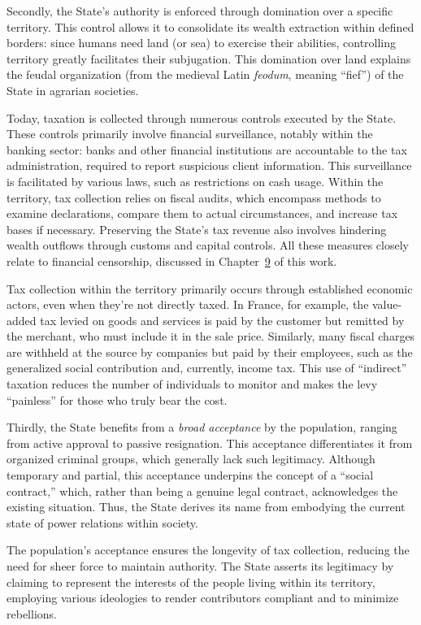 \documentclass[
  a5paper,
  smalldemyvopaper,10pt,twoside,onecolumn,openright,extrafontsizes,hidelinks]{memoir}
\begin{document}
Secondly, the State's authority is enforced through domination over a
specific territory. This control allows it to consolidate its wealth
extraction within defined borders: since humans need land (or sea) to
exercise their abilities, controlling territory greatly facilitates
their subjugation. This domination over land explains the feudal
organization (from the medieval Latin \emph{feodum}, meaning ``fief'')
of the State in agrarian societies.

Today, taxation is collected through numerous controls executed by the
State. These controls primarily involve financial surveillance, notably
within the banking sector: banks and other financial institutions are
accountable to the tax administration, required to report suspicious
client information. This surveillance is facilitated by various laws,
such as restrictions on cash usage. Within the territory, tax collection
relies on fiscal audits, which encompass methods to examine
declarations, compare them to actual circumstances, and increase tax
bases if necessary. Preserving the State's tax revenue also involves
hindering wealth outflows through customs and capital controls. All
these measures closely relate to financial censorship, discussed in
Chapter~\hyperref[ch:censure]{9} of this work.

Tax collection within the territory primarily occurs through established
economic actors, even when they're not directly taxed. In France, for
example, the value-added tax levied on goods and services is paid by the
customer but remitted by the merchant, who must include it in the sale
price. Similarly, many fiscal charges are withheld at the source by
companies but paid by their employees, such as the generalized social
contribution and, currently, income tax. This use of ``indirect''
taxation reduces the number of individuals to monitor and makes the levy
``painless'' for those who truly bear the cost.

Thirdly, the State benefits from a \emph{broad acceptance} by the
population, ranging from active approval to passive resignation. This
acceptance differentiates it from organized criminal groups, which
generally lack such legitimacy. Although temporary and partial, this
acceptance underpins the concept of a ``social contract,'' which, rather
than being a genuine legal contract, acknowledges the existing
situation. Thus, the State derives its name from embodying the current
state of power relations within society.

The population's acceptance ensures the longevity of tax collection,
reducing the need for sheer force to maintain authority. The State
asserts its legitimacy by claiming to represent the interests of the
people living within its territory, employing various ideologies to
render contributors compliant and to minimize rebellions.
\end{document}
